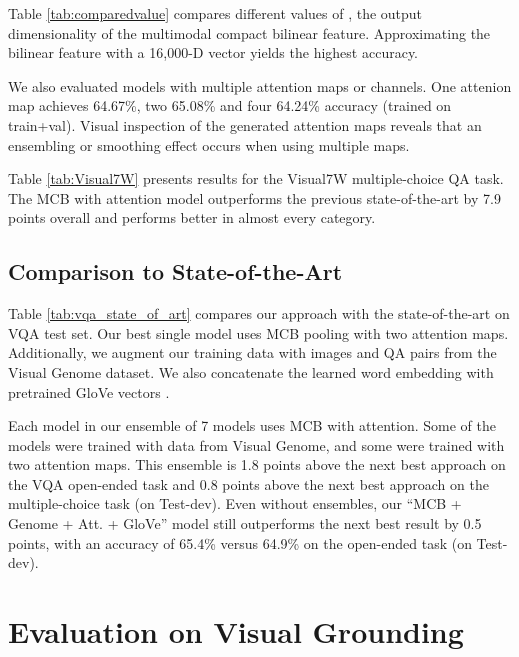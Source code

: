 \documentclass[11pt,letterpaper]{article}
\begin{document}
Table \ref{tab:comparedvalue} compares different values of , the output dimensionality of the multimodal compact bilinear feature. Approximating the bilinear feature with a 16,000-D vector yields the highest accuracy. 

We also evaluated models with multiple attention maps or channels. One attenion map achieves 64.67\%, two
 65.08\% and four 64.24\% accuracy (trained on train+val). Visual inspection of the generated attention maps reveals that an ensembling or smoothing effect occurs when using multiple maps. 





Table \ref{tab:Visual7W} presents results for the Visual7W multiple-choice QA task. The MCB with attention model outperforms the previous state-of-the-art by 7.9 points overall and performs better in almost every category. 

\subsection{Comparison to State-of-the-Art}
\label{sec:eval:stateoftheart}
Table \ref{tab:vqa_state_of_art} compares our approach with the state-of-the-art on VQA test set. Our best single model uses MCB pooling with two attention maps. Additionally, we augment our training data with images and QA pairs from the Visual Genome dataset. We also concatenate the learned word embedding with pretrained GloVe vectors \cite{pennington2014glove}.

Each model in our ensemble of 7 models uses MCB with attention. Some of the models were trained with data from Visual Genome, and some were trained with two attention maps. This ensemble is 1.8 points above the next best approach on the VQA open-ended task and 0.8 points above the next best approach on the multiple-choice task (on Test-dev). Even without ensembles, our ``MCB + Genome + Att. + GloVe'' model still outperforms the next best result by 0.5 points, with an accuracy of 65.4\% versus 64.9\% on the open-ended task (on Test-dev).

\section{Evaluation on Visual Grounding}
\end{document}
